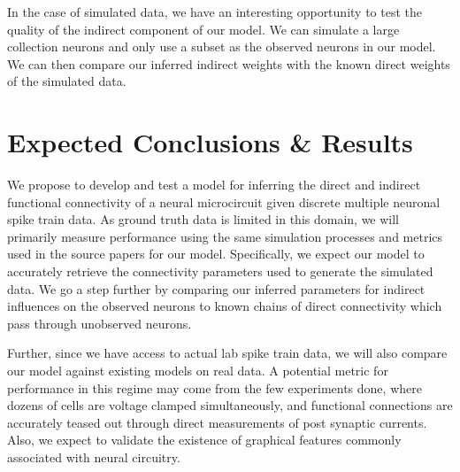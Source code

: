 \documentclass{article}
\begin{document}
In the case of simulated data, we have an interesting opportunity to test the quality of the indirect component of our model. We can simulate a large collection neurons and only use a subset as the observed neurons in our model. We can then compare our inferred indirect weights with the known direct weights of the simulated data.

\section{Expected Conclusions \& Results}
We propose to develop and test a model for inferring the direct and indirect functional connectivity of a neural microcircuit given discrete multiple neuronal spike train data. As ground truth data is limited in this domain, we will primarily measure performance using the same simulation processes and metrics used in the source papers for our model.  Specifically, we expect our model to accurately retrieve the connectivity parameters used to generate the simulated data. We go a step further by comparing our inferred parameters for indirect influences on the observed neurons to known chains of direct connectivity which pass through unobserved neurons.

Further, since we have access to actual lab spike train data, we will also compare our model against existing models on real data.  A potential metric for performance in this regime may come from the few experiments done, where dozens of cells are voltage clamped simultaneously, and functional connections are accurately teased out through direct measurements of post synaptic currents.  Also, we expect to validate the existence of graphical features commonly associated with neural circuitry.

\begin{small}

 
\end{small}
\end{document}
